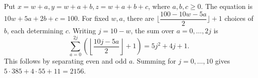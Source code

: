 Put $x=w+a,y=w+a+b,z=w+a+b+c$, where $a,b,c\ge0$. The equation is $10w+5a+2b+c=100$. For fixed $w,a$, there are $\lfloor\dfrac{100-10w-5a}{2}\rfloor+1$ choices of $b$, each determining $c$. Writing $j=10-w$, the sum over $a=0,\ldots,2j$ is
\[
\sum_{a=0}^{2j}\left(\left\lfloor\dfrac{10j-5a}{2}\right\rfloor+1\right)=5j^2+4j+1.
\]
This follows by separating even and odd $a$. Summing for $j=0,\ldots,10$ gives $5\cdot385+4\cdot55+11=\boxed{2156}$.
